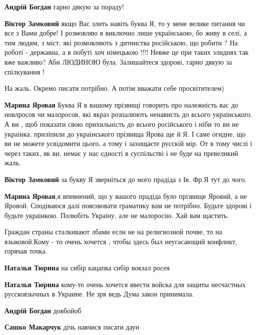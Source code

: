 \begin{itemize}
\begin{itemize}
\textbf{Андрій Богдан} гарно дякую за пораду!

\textbf{Віктор Замковий} якщо Вас злить навіть буква Я, то у мене велике
питання чи все з Вами добре! І розмовляю я виключно лише українською, бо живу в
селі, а тим людям, з міст, які розмовляють з дитинства російською, що робити ?
На роботі - державна, а в побуті хоч німецькою !!!! Невже це при таких злиднях
так вже важливо? Аби ЛЮДИНОЮ була. Залишайтеся здорові, гарно дякую за
спілкування !

На жаль. Окремо писати потрібно. А потім вважати себе просвітителем)

\textbf{Марина Яровая} Буква Я в вашому прізвищі говорить про належність вас до новлросов чи малоросов, які якраз розпалюють ненависть до всього украінського. А ви , щоб показати свою прихильність до всього російського і ніби то ви не украінка, приліпили до украінського прізвища Ярова ще й Я. І саме огидне, що ви не можете усвідомити цього, а тому і захищаєте русскій мір. От в тому числі і через таких, як ви, немає у нас єдності в суспільстві і не буде на превеликий жаль.

\textbf{Віктор Замковий} за букву Я зверніться до мого прадіда з Ів. Фр.Я тут до чого.

\textbf{Марина Яровая},я впевнений, що у вашого прадіда було прізвище Яровий, а не Яровой. Сподіваюся далі пояснювати граматику вам не потрібно. Будьте здорові і будьте украінкою. Полюбіть Украіну, але не малоросію. Хай вам щастить.
\end{itemize}


Граждан страны сталкивают лбами если не на религиозной почве, то на
языковой.Кому - то очень хочется , чтобы здесь был неугасающий конфликт,
горячая точка.

\begin{itemize}
\textbf{Наталья Тюрина} на сибір кацапка сибір вокзал росея \Laughey[1.0]

\textbf{Наталья Тюрина} кому-то очень хочется ввести войска для защиты несчастных русскоязычных в Украине. Не зря ведь Дума закон принимала.

\textbf{Андрій Богдан} довбойоб

\textbf{Сашко Макарчук} дічь навчися писати даун \Laughey[1.0]\Laughey[1.0]\Laughey[1.0]\Laughey[1.0]\Laughey[1.0]\Laughey[1.0]\Laughey[1.0]


\end{itemize}
\end{itemize}

